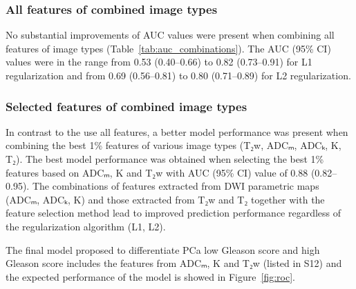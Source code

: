 \subsubsection{All features of combined image types}

No substantial improvements of AUC values were present when combining all
features of image types (Table~\ref{tab:auc_combinations}). The AUC (95\% CI)
values were in the range from 0.53 (0.40--0.66) to 0.82 (0.73--0.91) for L1
regularization and from 0.69 (0.56--0.81) to 0.80 (0.71--0.89) for L2
regularization.


\subsubsection{Selected features of combined image types}

In contrast to the use all features, a better model performance was present when
combining the best 1\% features of various image types (T₂w, ADCₘ, ADCₖ, K,
T₂). The best model performance was obtained when selecting the best 1\%
features based on ADCₘ, K and T₂w with AUC (95\% CI) value of 0.88
(0.82--0.95). The combinations of features extracted from DWI parametric maps
(ADCₘ, ADCₖ, K) and those extracted from T₂w and T₂ together with the
feature selection method lead to improved prediction performance regardless of
the regularization algorithm (L1, L2).

The final model proposed to differentiate PCa low Gleason score and high Gleason
score includes the features from ADCₘ, K and T₂w (listed in S12) and the
expected performance of the model is showed in Figure~\ref{fig:roc}.
